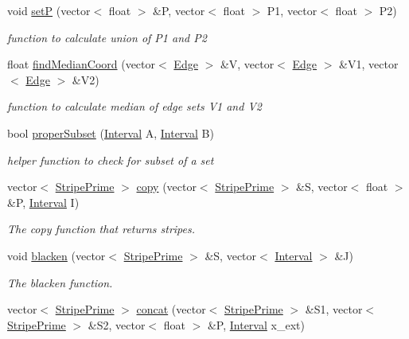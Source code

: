 \begin{DoxyCompactItemize}
void \hyperlink{classContour_a74ab977c279575010af78733569c648d}{setP} (vector$<$ float $>$ \&P, vector$<$ float $>$ P1, vector$<$ float $>$ P2)
\begin{DoxyCompactList}\small\item\em function to calculate union of P1 and P2 \end{DoxyCompactList}\item 
float \hyperlink{classContour_a33d8bf3ecbf269674b48d35310d01800}{find\+Median\+Coord} (vector$<$ \hyperlink{classEdge}{Edge} $>$ \&V, vector$<$ \hyperlink{classEdge}{Edge} $>$ \&V1, vector$<$ \hyperlink{classEdge}{Edge} $>$ \&V2)
\begin{DoxyCompactList}\small\item\em function to calculate median of edge sets V1 and V2 \end{DoxyCompactList}\item 
bool \hyperlink{classContour_a96e3306fd29f86f54fd49c095a0a9bff}{proper\+Subset} (\hyperlink{classInterval}{Interval} A, \hyperlink{classInterval}{Interval} B)
\begin{DoxyCompactList}\small\item\em helper function to check for subset of a set \end{DoxyCompactList}\item 
vector$<$ \hyperlink{classStripePrime}{Stripe\+Prime} $>$ \hyperlink{classContour_a6eb03ad9779df6fabdb541f75a64ea92}{copy} (vector$<$ \hyperlink{classStripePrime}{Stripe\+Prime} $>$ \&S, vector$<$ float $>$ \&P, \hyperlink{classInterval}{Interval} I)
\begin{DoxyCompactList}\small\item\em The copy function that returns stripes. \end{DoxyCompactList}\item 
void \hyperlink{classContour_abbb3cdafee0371a3d17fdc4492254581}{blacken} (vector$<$ \hyperlink{classStripePrime}{Stripe\+Prime} $>$ \&S, vector$<$ \hyperlink{classInterval}{Interval} $>$ \&J)
\begin{DoxyCompactList}\small\item\em The blacken function. \end{DoxyCompactList}\item 
vector$<$ \hyperlink{classStripePrime}{Stripe\+Prime} $>$ \hyperlink{classContour_a5d610630ea9afaa4921f832287811a0e}{concat} (vector$<$ \hyperlink{classStripePrime}{Stripe\+Prime} $>$ \&S1, vector$<$ \hyperlink{classStripePrime}{Stripe\+Prime} $>$ \&S2, vector$<$ float $>$ \&P, \hyperlink{classInterval}{Interval} x\+\_\+ext)

\end{DoxyCompactItemize}
